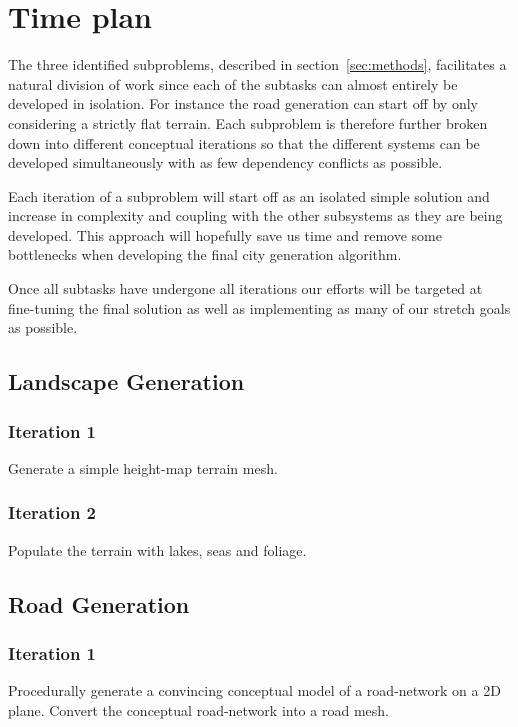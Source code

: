 \section{Time plan}

The three identified subproblems, described in section~\ref{sec:methods}, facilitates a natural division of work since each of the subtasks can almost entirely be developed in isolation.
For instance the road generation can start off by only considering a strictly flat terrain.
Each subproblem is therefore further broken down into different conceptual iterations so that the different systems can be developed simultaneously with as few dependency conflicts as possible.

Each iteration of a subproblem will start off as an isolated simple solution and increase in complexity and coupling with the other subsystems as they are being developed.
This approach will hopefully save us time and remove some bottlenecks when developing the final city generation algorithm.

Once all subtasks have undergone all iterations our efforts will be targeted at fine-tuning the final solution as well as implementing as many of our stretch goals as possible.

\subsection{Landscape Generation}
\subsubsection{Iteration 1}
Generate a simple height-map terrain mesh.

\subsubsection{Iteration 2}
Populate the terrain with lakes, seas and foliage.

\subsection{Road Generation}
\subsubsection{Iteration 1}
Procedurally generate a convincing conceptual model of a road-network on a 2D plane.
Convert the conceptual road-network into a road mesh.

